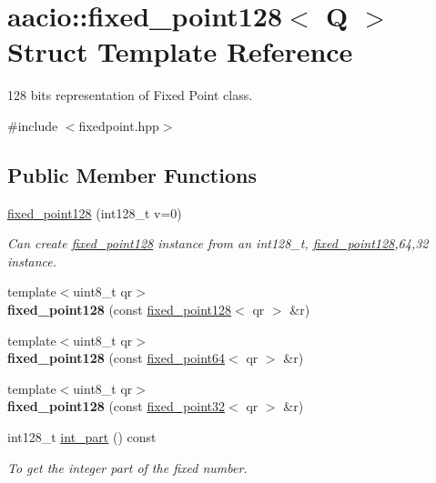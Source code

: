 \hypertarget{structaacio_1_1fixed__point128}{}\section{aacio\+:\+:fixed\+\_\+point128$<$ Q $>$ Struct Template Reference}
\label{structaacio_1_1fixed__point128}


128 bits representation of Fixed Point class.  




{\ttfamily \#include $<$fixedpoint.\+hpp$>$}

\subsection*{Public Member Functions}
\begin{DoxyCompactItemize}
\item 
\mbox{\hyperlink{structaacio_1_1fixed__point128_a6e270112328d9350e6ea9383ae4f75d6}{fixed\+\_\+point128}} (int128\+\_\+t v=0)
\begin{DoxyCompactList}\small\item\em Can create \mbox{\hyperlink{structaacio_1_1fixed__point128}{fixed\+\_\+point128}} instance from an int128\+\_\+t, \mbox{\hyperlink{structaacio_1_1fixed__point128}{fixed\+\_\+point128}},64,32 instance. \end{DoxyCompactList}\item 
{\footnotesize template$<$uint8\+\_\+t qr$>$ }\\{\bfseries fixed\+\_\+point128} (const \mbox{\hyperlink{structaacio_1_1fixed__point128}{fixed\+\_\+point128}}$<$ qr $>$ \&r)
\item 
{\footnotesize template$<$uint8\+\_\+t qr$>$ }\\{\bfseries fixed\+\_\+point128} (const \mbox{\hyperlink{structaacio_1_1fixed__point64}{fixed\+\_\+point64}}$<$ qr $>$ \&r)
\item 
{\footnotesize template$<$uint8\+\_\+t qr$>$ }\\{\bfseries fixed\+\_\+point128} (const \mbox{\hyperlink{structaacio_1_1fixed__point32}{fixed\+\_\+point32}}$<$ qr $>$ \&r)
\item 
int128\+\_\+t \mbox{\hyperlink{structaacio_1_1fixed__point128_afa6c34544131eade5edfab1888f31e58}{int\+\_\+part}} () const
\begin{DoxyCompactList}\small\item\em To get the integer part of the fixed number. \end{DoxyCompactList}\item 

\end{DoxyCompactItemize}
